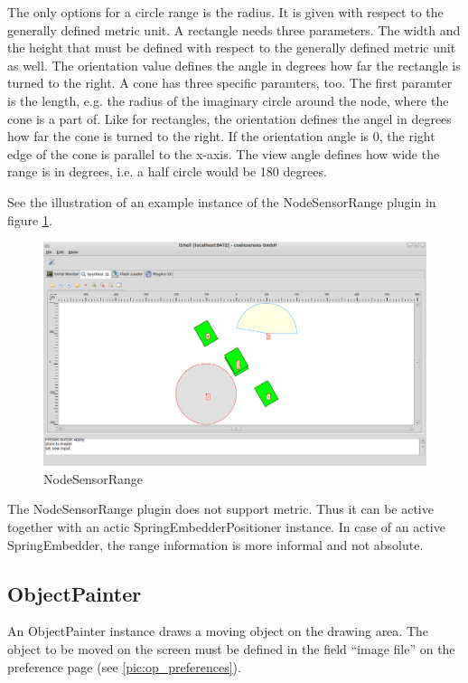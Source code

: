 The only options for a circle range is the radius. It is given with respect to the generally defined metric unit.
A rectangle needs three parameters. The width and the height that must be defined with respect to the generally
defined metric unit as well. The orientation value defines the angle in degrees how far the rectangle is
turned to the right. A cone has three specific paramters, too. The first paramter is the length, e.g. the
radius of the imaginary circle around the node, where the cone is a part of. Like for rectangles, the orientation
defines the angel in degrees how far the cone is turned to the right. If the orientation angle is 0, the right
edge of the cone is parallel to the x-axis. The view angle defines how wide the range is
in degrees, i.e. a half circle would be 180 degrees.

See the illustration of an example instance of the NodeSensorRange plugin in figure \ref{pic:nsr}.

\begin{figure}[htb]
  \begin{center}
    \includegraphics[width=13.2cm]{./pics/nodesensorrange}
    \caption{NodeSensorRange}
    \label{pic:nsr}
  \end{center}
\end{figure}

The NodeSensorRange plugin does not support metric. Thus it can be active together with an actic SpringEmbedderPositioner
instance. In case of an active SpringEmbedder, the range information is more informal and not absolute.

\subsection{ObjectPainter}

An ObjectPainter instance draws a moving object on the drawing area. The object to be moved on the screen must be
defined in the field ``image file'' on the preference page (see \ref{pic:op_preferences}).

